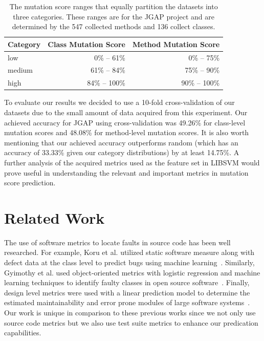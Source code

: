 \documentclass[conference]{IEEEtran}
\begin{document}
\begin{table}[!t]
  \centering
  \begin{tabular}{|l|r|r|}
    \hline
    \rowcolor[RGB]{169,196,223}
    \textbf{Category} & \textbf{Class Mutation Score} & \textbf{Method Mutation Score} \\
    \hline low & 0\% -- 61\% & 0\% -- 75\% \\
    \hline medium & 61\% -- 84\% & 75\% -- 90\% \\
    \hline high & 84\% -- 100\% & 90\% -- 100\% \\
    \hline
  \end{tabular}
  \caption{The mutation score ranges that equally partition the datasets into three categories. These ranges are for the JGAP project and are determined by the 547 collected methods and 136 collect classes.}
  \label{tab:results_details}
\end{table}


To evaluate our results we decided to use a 10-fold cross-validation of our datasets due to the small amount of data acquired from this experiment. Our achieved accuracy for JGAP using cross-validation was 49.26\% for class-level mutation scores and 48.08\% for method-level mutation scores. It is also worth mentioning that our achieved accuracy outperforms random (which has an accuracy of 33.33\% given our category distributions) by at least 14.75\%. A further analysis of the acquired metrics used as the feature set in LIBSVM would prove useful in understanding the relevant and important metrics in mutation score prediction.


\section{Related Work}
\label{sec:related_work}
The use of software metrics to locate faults in source code has been well researched. For example, Koru et al. utilized static software measure along with defect data at the class level to predict bugs using machine learning~\cite{KL05}. Similarly, Gyimothy et al. used object-oriented metrics with logistic regression and machine learning techniques to identify faulty classes in open source software~\cite{GFS05}. Finally, design level metrics were used with a linear prediction model to determine the estimated maintainability and error prone modules of large software systems~\cite{MKPS00}. Our work is unique in comparison to these previous works since we not only use source code metrics but we also use test suite metrics to enhance our predication capabilities.
\end{document}
